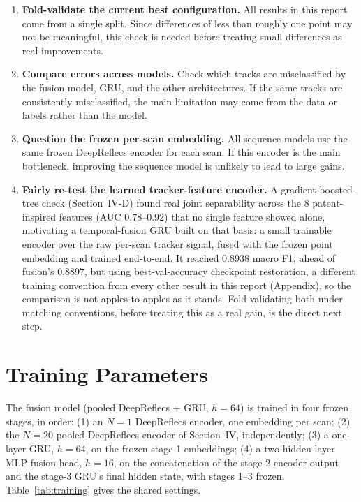 \documentclass[10pt,letterpaper]{IEEEtran}
\begin{document}
\begin{enumerate}
\item \textbf{Fold-validate the current best configuration.} All results in
  this report come from a single split. Since differences of less than
  roughly one point may not be meaningful, this check is needed before
  treating small differences as real improvements.
\item \textbf{Compare errors across models.} Check which tracks are
  misclassified by the fusion model, GRU, and the other architectures. If
  the same tracks are consistently misclassified, the main limitation may
  come from the data or labels rather than the model.
\item \textbf{Question the frozen per-scan embedding.} All sequence models
  use the same frozen DeepReflecs encoder for each scan. If this encoder is
  the main bottleneck, improving the sequence model is unlikely to lead to
  large gains.
\item \textbf{Fairly re-test the learned tracker-feature encoder.} A
  gradient-boosted-tree check (Section~IV-D) found real joint separability
  across the 8 patent-inspired features (AUC 0.78--0.92) that no single
  feature showed alone, motivating a temporal-fusion GRU built on that
  basis: a small trainable encoder over the raw per-scan tracker signal,
  fused with the frozen point embedding and trained end-to-end. It reached
  0.8938 macro F1, ahead of fusion's 0.8897, but using best-val-accuracy
  checkpoint restoration, a different training convention from every other
  result in this report (Appendix), so the comparison is not
  apples-to-apples as it stands. Fold-validating both under matching
  conventions, before treating this as a real gain, is the direct next
  step.
\end{enumerate}

\appendices
\section{Training Parameters}

The fusion model (pooled DeepReflecs + GRU, $h{=}64$) is trained in four
frozen stages, in order: (1) an $N{=}1$ DeepReflecs encoder, one embedding
per scan; (2) the $N{=}20$ pooled DeepReflecs encoder of Section~IV,
independently; (3) a one-layer GRU, $h{=}64$, on the frozen stage-1
embeddings; (4) a two-hidden-layer MLP fusion head, $h{=}16$, on the
concatenation of the stage-2 encoder output and the stage-3 GRU's final
hidden state, with stages 1--3 frozen. Table~\ref{tab:training} gives the
shared settings.
\end{document}
